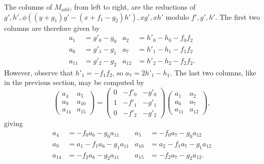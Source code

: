 The columns of $M_{\text{add}}$, from left to right,
are the reductions of $g',h',\phi((y + g_1)g' - (x + f_1 - g_2)h'),xg',xh'$ modulo $f',g',h'$.
The first two columns are therefore given by
\begin{align*}
  a_1    &= g'_0 - g_0 & a_2    &= h'_0 - h_0 - f_0f_2 \\
  a_6    &= g'_1 - g_1 & a_7    &= h'_1 - h_1 - f_1f_2 \\
  a_{11} &= g'_2 - g_2 & a_{12} &= h'_2 - h_2 - f_2f_2.
\end{align*}
However, observe that $h'_1 = -f_1f_2$, so $a_7 = 2h'_1 - h_1$.
The last two columns, like in the previous section, may be computed by
\[ 
  \begin{pmatrix}
    a_4    & a_5    \\
    a_9    & a_{10} \\
    a_{14} & a_{15}
  \end{pmatrix} = 
  \begin{pmatrix}
    0 & -f'_0 & -g'_0 \\
    1 & -f'_1 & -g'_1 \\
    0 & -f'_2 & -g'_2
  \end{pmatrix}
  \begin{pmatrix}
    a_1    & a_2    \\
    a_6    & a_7    \\
    a_{11} & a_{12}
  \end{pmatrix},
\]
giving
\begin{align*}
  a_4    &=     - f_0a_6 - g_0a_{11} & a_5    &=     - f_0a_7 - g_0a_{12} \\
  a_9    &= a_1 - f_1a_6 - g_1a_{11} & a_{10} &= a_2 - f_1a_7 - g_1a_{12} \\
  a_{14} &=     - f_2a_6 - g_2a_{11} & a_{15} &=     - f_2a_7 - g_2a_{12}.
\end{align*}

